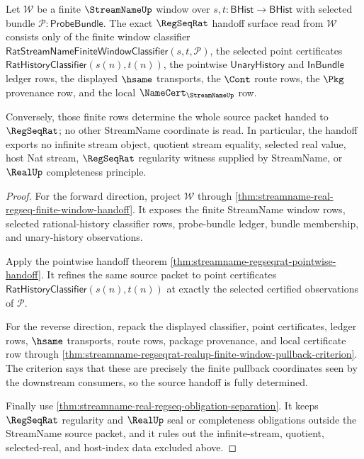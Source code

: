\begin{theorem}
\label{thm:streamname-regseq-window-handoff-exactness}
Let $\mathcal{W}$ be a finite $\StreamNameUp$ window over
$s,t:\mathsf{BHist}\to\mathsf{BHist}$ with selected bundle
$\mathcal{P}:\mathsf{ProbeBundle}$. The exact $\RegSeqRat$ handoff surface
read from $\mathcal{W}$ consists only of the finite window classifier
$\mathsf{RatStreamNameFiniteWindowClassifier}(s,t,\mathcal{P})$, the
selected point certificates $\mathsf{RatHistoryClassifier}(s(n),t(n))$, the
pointwise $\mathsf{UnaryHistory}$ and $\mathsf{InBundle}$ ledger rows, the
displayed $\hsame$ transports, the $\Cont$ route rows, the $\Pkg$ provenance
row, and the local $\NameCert_{\StreamNameUp}$ row.

Conversely, those finite rows determine the whole source packet handed to
$\RegSeqRat$; no other StreamName coordinate is read. In particular, the
handoff exports no infinite stream object, quotient stream equality, selected
real value, host Nat stream, $\RegSeqRat$ regularity witness supplied by
StreamName, or $\RealUp$ completeness principle.
\end{theorem}
\begin{proof}
For the forward direction, project $\mathcal{W}$ through
\autoref{thm:streamname-real-regseq-finite-window-handoff}. It exposes the
finite StreamName window rows, selected rational-history classifier rows,
probe-bundle ledger, bundle membership, and unary-history observations.

Apply the pointwise handoff theorem
\autoref{thm:streamname-regseqrat-pointwise-handoff}. It refines the same
source packet to point certificates
$\mathsf{RatHistoryClassifier}(s(n),t(n))$ at exactly the selected certified
observations of $\mathcal{P}$.

For the reverse direction, repack the displayed classifier, point
certificates, ledger rows, $\hsame$ transports, route rows, package
provenance, and local certificate row through
\autoref{thm:streamname-regseqrat-realup-finite-window-pullback-criterion}.
The criterion says that these are precisely the finite pullback coordinates
seen by the downstream consumers, so the source handoff is fully determined.

Finally use \autoref{thm:streamname-real-regseq-obligation-separation}. It
keeps $\RegSeqRat$ regularity and $\RealUp$ seal or completeness obligations
outside the StreamName source packet, and it rules out the infinite-stream,
quotient, selected-real, and host-index data excluded above.
\end{proof}

